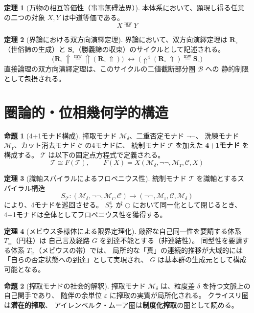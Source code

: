 \documentclass[11pt,a4paper]{ltjsarticle}
\newcommand{\mweq}{\mathrel{\overset{\mathrm{mw}}{=}}}
\newcommand{\metanegation}{\Uparrow}
\newcommand{\dfix}{\bigcirc}
\newcommand{\Rmw}{\mathbf{R}_{\circ}}
\newcommand{\Svoid}{\mathbf{S}_{\circ}}
\newcommand{\Bval}{\mathcal{B}}
\newcommand{\Md}{\mathcal{M}_\delta}
\newcommand{\Mnn}{\neg\neg}
\newcommand{\Mr}{\mathcal{M}_{\mathrm{r}}}
\newcommand{\MC}{\mathcal{C}}
\newcommand{\MT}{\mathcal{T}}
\theoremstyle{definition}
\newtheorem{theorem}{定理}[section]
\newtheorem{proposition}{命題}[section]
\begin{document}
\begin{theorem}[万物の相互等価性（事事無碍法界）]
本体系において、顕現し得る任意の二つの対象 $X, Y$ は中道等価である。
\[
X \mweq Y
\]
\end{theorem}

\begin{theorem}[界論における双方向演繹定理]
界論において、双方向演繹定理は
$\Rmw$（世俗諦の生成）と $\Svoid$（勝義諦の収束）のサイクルとして記述される。
\[
\bigl(\Rmw\,\metanegation \mweq \metanegation(\Rmw\,\metanegation)\bigr)
\;\leftrightarrow\;
\bigl(\metanegation^4(\Rmw\,\metanegation) \mweq \Svoid\bigr)
\]
直接論理の双方向演繹定理は、このサイクルの二値截断部分圏 $\Bval$ への
静的制限として包摂される。
\end{theorem}

\section{圏論的・位相幾何学的構造}

\begin{proposition}[4+1モナド構成]
搾取モナド $\Md$、二重否定モナド $\Mnn$、
洗練モナド $\Mr$、カット消去モナド $\MC$ の4モナドに、
統制モナド $\MT$ を加えた \textbf{4+1モナド} を構成する。
$\MT$ は以下の固定点方程式で定義される。
\[
\MT \cong F(\MT),\qquad F(X) = X(\Md,\Mnn,\Mr,\MC,X)
\]
\end{proposition}

\begin{theorem}[識軸スパイラルによるフロベニウス性]
統制モナド $\MT$ を識軸とするスパイラル構造
\[
S_{\MT}: (\Md,\Mnn,\Mr,\MC) \longrightarrow (\Mnn,\Mr,\MC,\Md)
\]
により、4モナドを巡回させる。
$S_{\MT}^4$ が $\dfix$ において同一化として閉じるとき、
4+1モナドは全体としてフロベニウス性を獲得する。
\end{theorem}

\begin{theorem}[メビウス多様体による限界定理化]
厳密な自己同一性を要請する体系 $T_{=}$（円柱）は
自己言及経路 $G$ を到達不能とする（非連結性）。
同型性を要請する体系 $T_{\cong}$（メビウスの帯）では、
局所的な「真」の連続的推移が大域的には「自らの否定状態への到達」として実現され、
$G$ は基本群の生成元として構成可能となる。
\end{theorem}

\begin{proposition}[搾取モナドの社会的解釈]
搾取モナド $\Md$ は、粒度差 $\delta$ を持つ文脈上の自己関手であり、
随伴の余単位 $\varepsilon$ に搾取の実質が局所化される。
クライスリ圏は\textbf{潜在的搾取}、
アイレンベルク・ムーア圏は\textbf{制度化搾取}の圏として読める。
\end{proposition}
\end{document}
